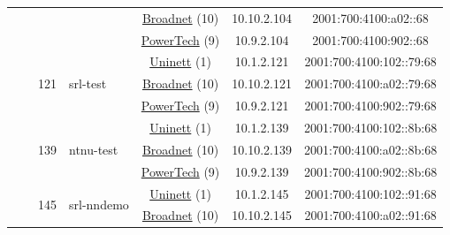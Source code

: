 \begin{small}
\begin{center}
\begin{longtable}{|c|c|c|c|c|c|c|c|}
  &  & \multicolumn{2}{|c|}{} & \multicolumn{2}{|c|}{\tiny{\href{https://www.broadnet.no}{Broadnet} (10)}} & \tiny{10.10.2.104} & \tiny{2001:700:4100:a02::68} \\* \cline{5-5}\cline{6-6}\cline{7-7}\cline{8-8}
  &  & \multicolumn{2}{|c|}{} & \multicolumn{2}{|c|}{\tiny{\href{http://www.powertech.no}{PowerTech} (9)}} & \tiny{10.9.2.104} & \tiny{2001:700:4100:902::68} \\* \cline{3-3}\cline{4-4}\cline{5-5}\cline{6-6}\cline{7-7}\cline{8-8}
  &  & \multirow{3}{*}{\tiny{121}} & \multicolumn{1}{|l|}{\multirow{3}{*}{\tiny{srl-test}}} & \multicolumn{2}{|c|}{\tiny{\href{https://www.uninett.no}{Uninett} (1)}} & \tiny{10.1.2.121} & \tiny{2001:700:4100:102::79:68} \\* \cline{5-5}\cline{6-6}\cline{7-7}\cline{8-8}
  &  &  &  & \multicolumn{2}{|c|}{\tiny{\href{https://www.broadnet.no}{Broadnet} (10)}} & \tiny{10.10.2.121} & \tiny{2001:700:4100:a02::79:68} \\* \cline{5-5}\cline{6-6}\cline{7-7}\cline{8-8}
  &  &  &  & \multicolumn{2}{|c|}{\tiny{\href{http://www.powertech.no}{PowerTech} (9)}} & \tiny{10.9.2.121} & \tiny{2001:700:4100:902::79:68} \\* \cline{3-3}\cline{4-4}\cline{5-5}\cline{6-6}\cline{7-7}\cline{8-8}
  &  & \multirow{3}{*}{\tiny{139}} & \multicolumn{1}{|l|}{\multirow{3}{*}{\tiny{ntnu-test}}} & \multicolumn{2}{|c|}{\tiny{\href{https://www.uninett.no}{Uninett} (1)}} & \tiny{10.1.2.139} & \tiny{2001:700:4100:102::8b:68} \\* \cline{5-5}\cline{6-6}\cline{7-7}\cline{8-8}
  &  &  &  & \multicolumn{2}{|c|}{\tiny{\href{https://www.broadnet.no}{Broadnet} (10)}} & \tiny{10.10.2.139} & \tiny{2001:700:4100:a02::8b:68} \\* \cline{5-5}\cline{6-6}\cline{7-7}\cline{8-8}
  &  &  &  & \multicolumn{2}{|c|}{\tiny{\href{http://www.powertech.no}{PowerTech} (9)}} & \tiny{10.9.2.139} & \tiny{2001:700:4100:902::8b:68} \\* \cline{3-3}\cline{4-4}\cline{5-5}\cline{6-6}\cline{7-7}\cline{8-8}
  &  & \multirow{3}{*}{\tiny{145}} & \multicolumn{1}{|l|}{\multirow{3}{*}{\tiny{srl-nndemo}}} & \multicolumn{2}{|c|}{\tiny{\href{https://www.uninett.no}{Uninett} (1)}} & \tiny{10.1.2.145} & \tiny{2001:700:4100:102::91:68} \\* \cline{5-5}\cline{6-6}\cline{7-7}\cline{8-8}
  &  &  &  & \multicolumn{2}{|c|}{\tiny{\href{https://www.broadnet.no}{Broadnet} (10)}} & \tiny{10.10.2.145} & \tiny{2001:700:4100:a02::91:68} \\* \cline{5-5}\cline{6-6}\cline{7-7}\cline{8-8}

\end{longtable}
\end{center}
\end{small}
